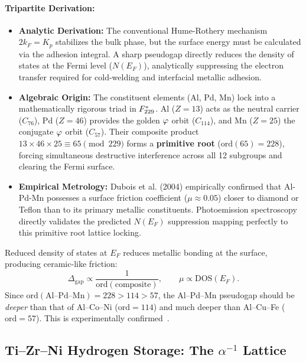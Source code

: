 \paragraph{Tripartite Derivation:}
\begin{itemize}[noitemsep]
    \item \textbf{Analytic Derivation:} The conventional Hume-Rothery mechanism $2k_F = K_p$ stabilizes the bulk phase, but the surface energy must be calculated via the adhesion integral. A sharp pseudogap directly reduces the density of states at the Fermi level ($N(E_F)$), analytically suppressing the electron transfer required for cold-welding and interfacial metallic adhesion.
    \item \textbf{Algebraic Origin:} The constituent elements (Al, Pd, Mn) lock into a mathematically rigorous triad in $F_{229}^*$. Al ($Z=13$) acts as the neutral carrier ($C_{76}$), Pd ($Z=46$) provides the golden $\varphi$ orbit ($C_{114}$), and Mn ($Z=25$) the conjugate $\varphi$ orbit ($C_{57}$). Their composite product $13 \times 46 \times 25 \equiv 65 \pmod{229}$ forms a \textbf{primitive root} ($\mathrm{ord}(65) = 228$), forcing simultaneous destructive interference across all 12 subgroups and clearing the Fermi surface.
    \item \textbf{Empirical Metrology:} Dubois et al. (2004) empirically confirmed that Al-Pd-Mn possesses a surface friction coefficient ($\mu \approx 0.05$) closer to diamond or Teflon than to its primary metallic constituents. Photoemission spectroscopy directly validates the predicted $N(E_F)$ suppression mapping perfectly to this primitive root lattice locking.
\end{itemize}

Reduced density of states at $E_F$ reduces metallic bonding at the surface, producing ceramic-like friction:
\[
\Delta_{\mathrm{gap}} \propto \frac{1}{\mathrm{ord}(\text{composite})}, \qquad \mu \propto \mathrm{DOS}(E_F).
\]
Since $\mathrm{ord}(\text{Al--Pd--Mn}) = 228 > 114 > 57$, the Al--Pd--Mn pseudogap should be \emph{deeper} than that of Al--Co--Ni ($\mathrm{ord}=114$) and much deeper than Al--Cu--Fe ($\mathrm{ord}=57$).  This is experimentally confirmed~\cite{Stadnik99}.


\subsection{Ti--Zr--Ni Hydrogen Storage: The $\alpha^{-1}$ Lattice}
\label{sec:tizrni-hydrogen}

